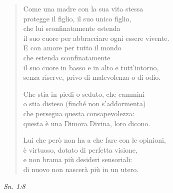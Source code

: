 \begin{quotation}
Come una madre con la sua vita stessa \\
protegge il figlio, il suo unico figlio, \\
che lui sconfinatamente estenda \\
il suo cuore per abbracciare ogni essere vivente. \\
E con amore per tutto il mondo \\
che estenda sconfinatamente \\
il suo cuore in basso e in alto e tutt’intorno, \\
senza riserve, privo di malevolenza o di odio.


Che stia in piedi o seduto, che cammini \\
o stia disteso (finché non s’addormenta) \\
che persegua questa consapevolezza: \\
questa è una Dimora Divina, loro dicono.


Lui che però non ha a che fare con le opinioni, \\
è virtuoso, dotato di perfetta visione, \\
e non brama più desideri sensoriali: \\
di nuovo non nascerà più in un utero.
\end{quotation}

\emph{Sn. 1:8}


